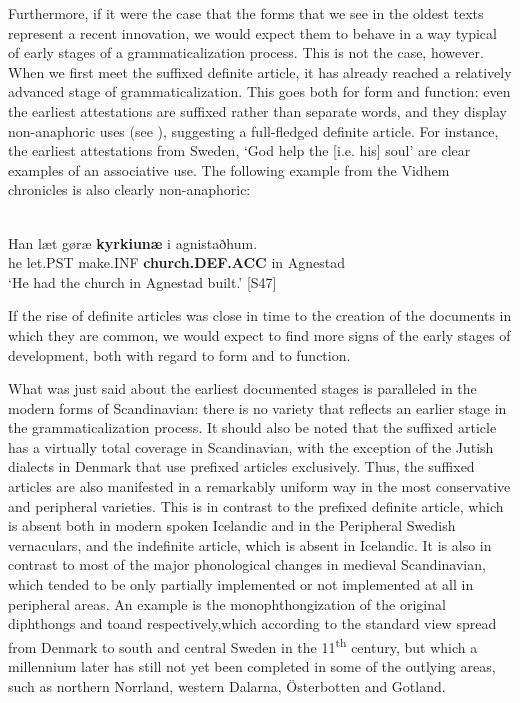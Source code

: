 Furthermore, if it were the case that the forms that we see in the oldest texts represent a recent innovation, we would expect them to behave in a way typical of early stages of a grammaticalization process. This is not the case, however. When we first meet the suffixed definite article, it has already reached a relatively advanced stage of grammaticalization. This goes both for form and function: even the earliest attestations are suffixed rather than separate words, and they display non-anaphoric uses (see ), suggesting a full-fledged definite article. For instance, the earliest attestations from Sweden, ‘God help the [i.e. his] soul’ are clear examples of an associative use. The following example from the Vidhem chronicles is also clearly non-anaphoric:

\ea\label{}
\\
\gll 	Han  læt  gøræ  \textbf{kyrkiunæ} i  agnistaðhum.\\
		he  let.PST  make.INF  \textbf{church.DEF.ACC} in  Agnestad\\
\glt 	‘He had the church in Agnestad built.’ [S47]

\z

If the rise of definite articles was close in time to the creation of the documents in which they are common, we would expect to find more signs of the early stages of development, both with regard to form and to function.

What was just said about the earliest documented stages is paralleled in the modern forms of Scandinavian: there is no variety that reflects an earlier stage in the grammaticalization process. It should also be noted that the suffixed article has a virtually total coverage in Scandinavian, with the exception of the Jutish dialects in Denmark that use prefixed articles exclusively. Thus, the suffixed articles are also manifested in a remarkably uniform way in the most conservative and peripheral varieties. This is in contrast to the prefixed definite article, which is absent both in modern spoken Icelandic and in the Peripheral Swedish vernaculars, and the indefinite article, which is absent in Icelandic. It is also in contrast to most of the major phonological changes in medieval Scandinavian, which tended to be only partially implemented or not implemented at all in peripheral areas. An example is the monophthongization of the original diphthongs  and toand respectively,\textstyleLinguisticExample{ }which according to the standard view spread from Denmark to south and central Sweden in the 11\textsuperscript{th} century, but which a millennium later has still not yet been completed in some of the outlying areas, such as northern Norrland, western Dalarna, Österbotten and Gotland.  

